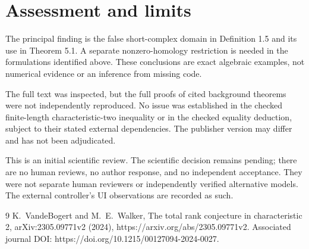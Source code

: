 \documentclass[10pt]{article}
\begin{document}
\section*{Assessment and limits}
The principal finding is the false short-complex domain in Definition 1.5 and its use in Theorem 5.1. A separate nonzero-homology restriction is needed in the formulations identified above. These conclusions are exact algebraic examples, not numerical evidence or an inference from missing code.\par
The full text was inspected, but the full proofs of cited background theorems were not independently reproduced. No issue was established in the checked finite-length characteristic-two inequality or in the checked equality deduction, subject to their stated external dependencies. The publisher version may differ and has not been adjudicated.\par
This is an initial scientific review. The scientific decision remains pending; there are no human reviews, no author response, and no independent acceptance. They were not separate human reviewers or independently verified alternative models. The external controller’s UI observations are recorded as such.\par
9 K. VandeBogert and M. E. Walker, The total rank conjecture in characteristic 2, arXiv:2305.09771v2 (2024), https://arxiv.org/abs/2305.09771v2. Associated journal DOI: https://doi.org/10.1215/00127094-2024-0027.\par
\end{document}
